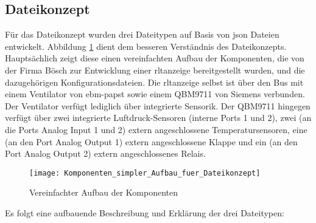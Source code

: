 \subsection{Dateikonzept} \label{json_config_files}
Für das Dateikonzept wurden drei Dateitypen auf Basis von \acs{json} Dateien entwickelt. Abbildung \ref{fig:vereinfachter_aufbau_dateikonzept} dient dem besseren Verständnis des Dateikonzepts. Hauptsächlich zeigt diese einen vereinfachten Aufbau der Komponenten, die von der Firma Bösch zur Entwicklung einer \acs{rltanzeige} bereitgestellt wurden, und die dazugehörigen Konfigurationsdateien. Die \acs{rltanzeige} selbst ist über den Bus mit einem Ventilator von ebm-papst sowie einem QBM9711 von Siemens verbunden. Der Ventilator verfügt lediglich über integrierte Sensorik. Der QBM9711 hingegen verfügt über zwei integrierte Luftdruck-Sensoren (interne Ports 1 und 2), zwei (an die Ports Analog Input 1 und 2) extern angeschlossene Temperatursensoren, eine (an den Port Analog Output 1) extern angeschlossene Klappe und ein (an den Port Analog Output 2) extern angeschlossenes Relais.


\begin{figure}[H]
	\centering
	\texttt{[image: Komponenten\_simpler\_Aufbau\_fuer\_Dateikonzept]}
	\caption{Vereinfachter Aufbau der Komponenten \label{fig:vereinfachter_aufbau_dateikonzept}}
\end{figure}

\newpage
Es folgt eine aufbauende Beschreibung und Erklärung der drei Dateitypen:

